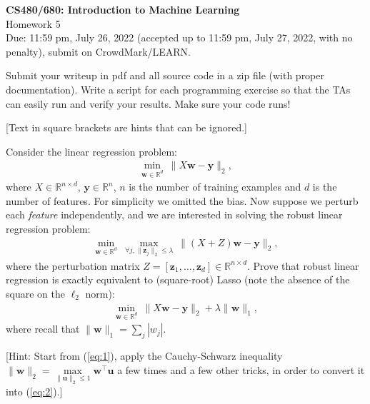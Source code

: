 \documentclass[10pt,letter,notitlepage]{article}
\newcommand{\RR}{\mathds{R}}
\newcommand{\wv}{\mathbf{w}}
\newcommand{\yv}{\mathbf{y}}
\newcommand{\zv}{\mathbf{z}}
\newcommand{\uv}{\mathbf{u}}
\newcounter{exercise}
\begin{document}
\begin{center}
  \large{\textbf{CS480/680: Introduction to Machine Learning} \\ Homework 5\\ Due: 11:59 pm, July 26, 2022 (accepted up to 11:59 pm, July 27, 2022, with no penalty), submit on CrowdMark/LEARN.} \\
\end{center}

\begin{center}
Submit your writeup in pdf and all source code in a zip file (with proper documentation). Write a script for each programming exercise so that the TAs can easily run and verify your results. Make sure your code runs!

[Text in square brackets are hints that can be ignored.]
\end{center}
\begin{exercise}
	Consider the linear regression problem:
	\begin{align}
	\min_{\wv \in \RR^d} ~ \|X \wv - \yv\|_2,
	\end{align}
	where $X \in \RR^{n \times d}$, $\yv \in \RR^n$, $n$ is the number of training examples and $d$ is the number of features. For simplicity we omitted the bias. Now suppose we perturb each \emph{feature} independently, and we are interested in solving the robust linear regression problem:
	\begin{align}
    \min_{\wv\in\RR^d} ~ \max_{\forall j, \|\zv_j\|_2 \leq \lambda} ~ \|(X + Z)\wv - \yv\|_2, \label{eq:1}
	\end{align}
	where the perturbation matrix $Z = [\zv_1, \ldots, \zv_d] \in \RR^{n \times d}$. Prove that robust linear regression is exactly equivalent to (square-root) Lasso (note the absence of the square on the $\ell_2$ norm):
	\begin{align}
    \min_{\wv \in \RR^d} ~ \| X \wv - \yv\|_2 + \lambda\|\wv\|_1, \label{eq:2}
	\end{align}
	where recall that $\|\wv\|_1 = \sum_j |w_j|$.

  [Hint: Start from (\ref{eq:1}), apply the Cauchy-Schwarz inequality $\|\wv\|_2 = \max\limits_{\|\uv\|_2 \leq 1} \wv^\top\uv$ a few times and a few other tricks, in order to convert it into (\ref{eq:2}).]

\end{exercise}
\end{document}
